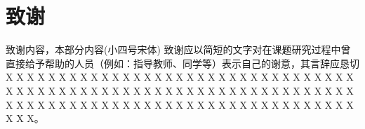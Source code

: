 

\section*{致谢}


致谢内容，本部分内容(小四号宋体) 致谢应以简短的文字对在课题研究过程中曾直接给予帮助的人员（例如：指导教师、同学等）表示自己的谢意，其言辞应恳切 X X X X X X X X X X X X X X X X X X X X X X X X X X X X X X X X X X X X X X X X X X X X X X X X X X X X X X X X X X X X X X X X X X X X X X X X X X X X X X X X X X X X X X X X X X X X X X X X X X X X X X。